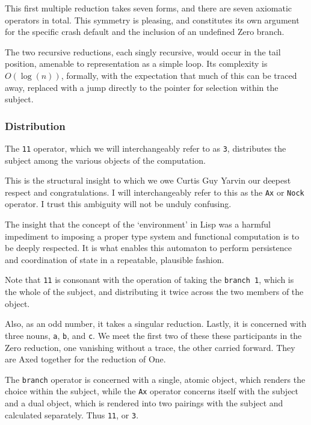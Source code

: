 \documentclass[twoside]{article}
\begin{document}
This first multiple reduction takes seven forms, and there are seven axiomatic operators in total. This symmetry is pleasing, and constitutes its own argument for the specific crash default and the inclusion of an undefined Zero branch.

The two recursive reductions, each singly recursive, would occur in the tail position, amenable to representation as a simple loop. Its complexity is $O(\log(n))$, formally, with the expectation that much of this can be traced away, replaced with a jump directly to the pointer for selection within the subject.

\subsubsection{Distribution}

The \texttt{11} operator, which we will interchangeably refer to as \texttt{3}, distributes the subject among the various objects of the computation.

This is the structural insight to which we owe Curtis Guy Yarvin our deepest respect and congratulations. I will interchangeably refer to this as the \texttt{Ax} or \texttt{Nock} operator. I trust this ambiguity will not be unduly confusing.

The insight that the concept of the `environment' in Lisp was a harmful impediment to imposing a proper type system and functional computation is to be deeply respected. It is what enables this automaton to perform persistence and coordination of state in a repeatable, plausible fashion.

Note that \texttt{11} is consonant with the operation of taking the \texttt{branch 1}, which is the whole of the subject, and distributing it twice across the two members of the object.

Also, as an odd number, it takes a singular reduction. Lastly, it is concerned with three nouns, \texttt{a}, \texttt{b}, and \texttt{c}. We meet the first two of these these participants in the Zero reduction, one vanishing without a trace, the other carried forward. They are Axed together for the reduction of One.

The \texttt{branch} operator is concerned with a single, atomic object, which renders the choice within the subject, while the \texttt{Ax} operator concerns itself with the subject and a dual object, which is rendered into two pairings with the subject and calculated separately. Thus \texttt{11}, or \texttt{3}.
\end{document}
